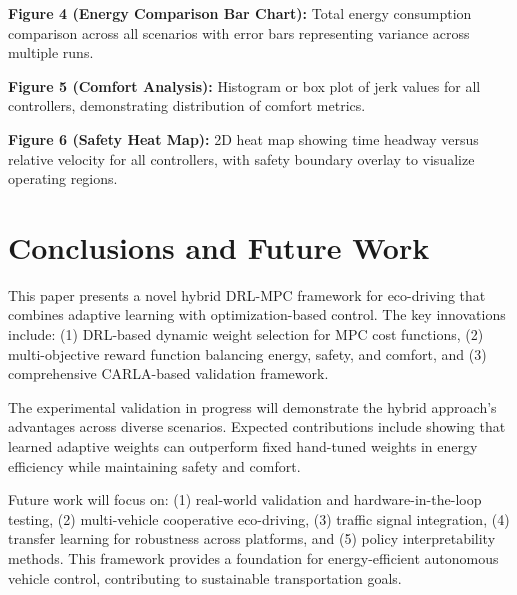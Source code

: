 \documentclass[conference,onecolumn,draftclsnofoot]{IEEEtran}
\begin{document}
\textbf{Figure 4 (Energy Comparison Bar Chart):} Total energy consumption comparison across all scenarios with error bars representing variance across multiple runs.

\textbf{Figure 5 (Comfort Analysis):} Histogram or box plot of jerk values for all controllers, demonstrating distribution of comfort metrics.

\textbf{Figure 6 (Safety Heat Map):} 2D heat map showing time headway versus relative velocity for all controllers, with safety boundary overlay to visualize operating regions.

\section{Conclusions and Future Work}

This paper presents a novel hybrid DRL-MPC framework for eco-driving that combines adaptive learning with optimization-based control. The key innovations include: (1) DRL-based dynamic weight selection for MPC cost functions, (2) multi-objective reward function balancing energy, safety, and comfort, and (3) comprehensive CARLA-based validation framework.

The experimental validation in progress will demonstrate the hybrid approach's advantages across diverse scenarios. Expected contributions include showing that learned adaptive weights can outperform fixed hand-tuned weights in energy efficiency while maintaining safety and comfort.

Future work will focus on: (1) real-world validation and hardware-in-the-loop testing, (2) multi-vehicle cooperative eco-driving, (3) traffic signal integration, (4) transfer learning for robustness across platforms, and (5) policy interpretability methods. This framework provides a foundation for energy-efficient autonomous vehicle control, contributing to sustainable transportation goals.
\end{document}
